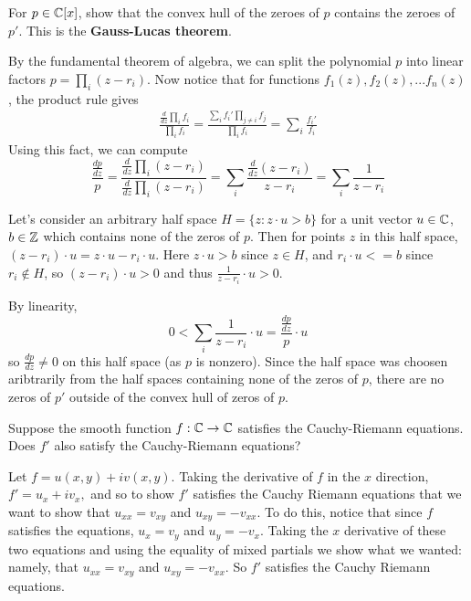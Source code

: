 \documentclass{homework}
\begin{document}
\begin{problem}
  For $p \in \mathbb{C}[x]$, show that the convex hull of the zeroes of $p$
  contains the zeroes of $p'$.  This is the \textbf{Gauss-Lucas
    theorem}.
\end{problem}
\begin{solution}
By the fundamental theorem of algebra, we can split the polynomial $p$ into linear factors $p = \prod_i(z - r_i).$
Now notice that for functions $f_1(z), f_2(z), ... f_n(z)$, the product rule gives
\begin{align}\label{log-derivative-product-to-sum}
\frac{\frac{d}{dz}\prod_i f_i}{\prod_i f_i} = \frac{\sum_i f_i'\prod_{j\neq i}f_j}{\prod_i f_i} = \sum_i\frac{ f_i'}{f_i}
\end{align}
Using this fact, we can compute
\[
\frac{\frac{dp}{dz}}{p} = \frac{\frac{d}{dz}\prod_i (z - r_i)}{\frac{d}{dz}\prod_i (z - r_i)} = \sum_i \frac{\frac{d}{dz}(z-r_i)}{z - r_i} = \sum_i \frac{1}{z - r_i}
\]

Let's consider an arbitrary half space $H=\{z: z\cdot u > b\}$ for a unit vector $u\in\mathbb{C}$, $b\in\mathbb{Z}$ which contains none of the zeros of $p$. Then for points $z$ in this half space, $(z-r_i)\cdot u = z\cdot u - r_i \cdot u$.
Here $z\cdot u > b$ since $z\in H$, and $r_i \cdot u <= b$ since $r_i\not\in H$, so $(z-r_i)\cdot u > 0$ and thus $\frac{1}{z-r_i}\cdot u > 0$.

By linearity, \[0 < \sum_i \frac{1}{z - r_i} \cdot u  = \frac{\frac{dp}{dz}}{p}\cdot u\] so $\frac{dp}{dz} \neq 0$ on this half space (as $p$ is nonzero). Since the half space was choosen aribtrarily from the half spaces containing none of the zeros of $p$, there are no zeros of $p'$ outside of the convex hull of zeros of $p$.
\end{solution}
\begin{problem}\label{cauchy-riemann-again}
  Suppose the smooth function $f : \mathbb{C} \to \mathbb{C}$ satisfies the
  Cauchy-Riemann equations.  Does $f'$ also satisfy the Cauchy-Riemann
  equations?
\end{problem}
\begin{solution}
Let $f = u(x,y) + iv(x,y).$ 
Taking the derivative of $f$ in the $x$ direction, $f' = u_x + iv_x,$ and so to show $f'$ satisfies the Cauchy Riemann equations that we want to show that $u_{xx}=v_{xy}$ and $u_{xy} = -v_{xx}.$ To do this, notice that since $f$ satisfies the equations, $u_{x} = v_y$ and $u_y=-v_x$. Taking the $x$ derivative of these two equations and using the equality of mixed partials we show what we wanted: namely, that $u_{xx}=v_{xy}$ and $u_{xy} = -v_{xx}.$ So $f'$ satisfies the Cauchy Riemann equations.
\end{solution}
\end{document}
